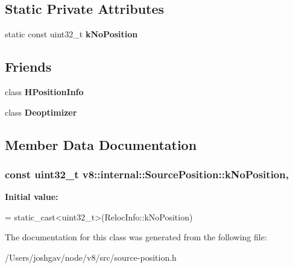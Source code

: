 \subsection*{Static Private Attributes}
\begin{DoxyCompactItemize}
\item 
static const uint32\+\_\+t {\bfseries k\+No\+Position}
\end{DoxyCompactItemize}
\subsection*{Friends}
\begin{DoxyCompactItemize}
\item 
class {\bfseries H\+Position\+Info}\hypertarget{classv8_1_1internal_1_1_source_position_a603ac2edcbd20d89b6fe13b83ef98ceb}{}\label{classv8_1_1internal_1_1_source_position_a603ac2edcbd20d89b6fe13b83ef98ceb}

\item 
class {\bfseries Deoptimizer}\hypertarget{classv8_1_1internal_1_1_source_position_aa89911581cd6ded032f998021aef9e5c}{}\label{classv8_1_1internal_1_1_source_position_aa89911581cd6ded032f998021aef9e5c}

\end{DoxyCompactItemize}


\subsection{Member Data Documentation}
\subsubsection[{\texorpdfstring{k\+No\+Position}{kNoPosition}}]{\setlength{\rightskip}{0pt plus 5cm}const uint32\+\_\+t v8\+::internal\+::\+Source\+Position\+::k\+No\+Position\hspace{0.3cm}{\ttfamily [static]}, {\ttfamily [private]}}\hypertarget{classv8_1_1internal_1_1_source_position_a3f5eadba49a78f83412ff4dd74b07200}{}\label{classv8_1_1internal_1_1_source_position_a3f5eadba49a78f83412ff4dd74b07200}
{\bfseries Initial value\+:}
\begin{DoxyCode}
=
      \textcolor{keyword}{static\_cast<}uint32\_t\textcolor{keyword}{>}(RelocInfo::kNoPosition)
\end{DoxyCode}


The documentation for this class was generated from the following file\+:\begin{DoxyCompactItemize}
\item 
/\+Users/joshgav/node/v8/src/source-\/position.\+h\end{DoxyCompactItemize}
